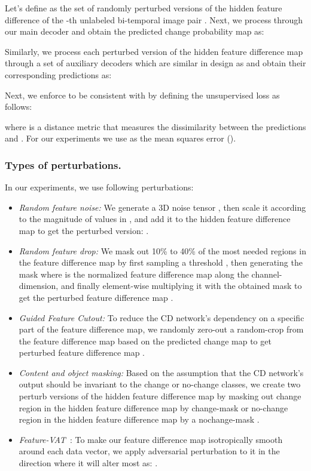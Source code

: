 \documentclass[runningheads]{llncs}
\begin{document}
Let's define   as the set of randomly perturbed versions of the hidden feature difference  of the -th unlabeled bi-temporal image pair . Next, we process  through our main decoder  and obtain the predicted change probability map as:

Similarly, we process each perturbed version of the hidden feature difference map through a set of  auxiliary decoders which are similar in design as  and obtain their corresponding predictions  as:

Next, we enforce  to be consistent with  by defining the unsupervised loss   as follows:

where  is a distance metric that measures the dissimilarity between the predictions  and . For our experiments we use  as the mean squares error (). 

\vspace{-5mm}
\subsubsection{Types of perturbations.} In our experiments, we use following perturbations:
\label{sec:types_of_pertb}
\begin{itemize}
    \item \textit{Random feature noise:} We generate a 3D noise tensor , then scale it according to the magnitude of values in , and add it to the hidden feature difference map to get the perturbed version: .
    \item \textit{Random feature drop:} We mask out 10\% to 40\% of the most needed regions in the feature difference map by first sampling a threshold , then generating the mask  where  is the normalized feature difference map  along the channel-dimension, and finally element-wise multiplying it with the obtained mask to get the perturbed feature difference map .
    \item \textit{Guided Feature Cutout:} To reduce the CD network's dependency on a specific part of the feature difference map, we randomly zero-out a random-crop from the feature difference map based on the predicted change map  to get perturbed feature difference map .
    \item \textit{Content and object masking:} Based on the assumption that the CD network's output should be invariant to the change or no-change classes, we create two perturb versions of the hidden feature difference map by masking out change region in the hidden feature difference map by change-mask  or no-change region in the hidden feature difference map by a nochange-mask . 
    \item{\textit{Feature-VAT}~\cite{miyato2018virtual}:} To make our feature difference map isotropically smooth around each data vector, we apply adversarial perturbation to it in the direction where it will alter most as: . 
\end{itemize}
\vspace{-5mm}
\end{document}
